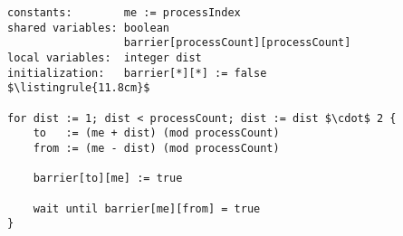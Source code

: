 \begin{minipage}
\centering
\begin{lstlisting}[mathescape, linewidth=11.8cm]
constants:        me := processIndex
shared variables: boolean
                  barrier[processCount][processCount]
local variables:  integer dist
initialization:   barrier[*][*] := false
$\listingrule{11.8cm}$

for dist := 1; dist < processCount; dist := dist $\cdot$ 2 {
	to   := (me + dist) (mod processCount)
	from := (me - dist) (mod processCount)
	
	barrier[to][me] := true
	
	wait until barrier[me][from] = true
}
\end{lstlisting}
\end{minipage}

